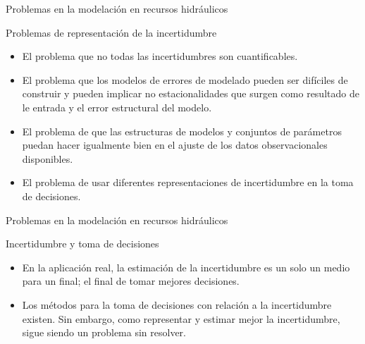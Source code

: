 \documentclass[
10pt,
aspectratio=169,
]{beamer}
\begin{document}
\begin{frame}{Problemas en la modelaci\'on en recursos hidr\'aulicos}
\begin{block}{Problemas de representación de la incertidumbre}
\begin{itemize}
\item El problema que no todas las incertidumbres son cuantificables.
\item El problema que los modelos de  errores de modelado pueden ser difíciles de construir y pueden implicar no estacionalidades que surgen como resultado de le entrada y el error estructural del modelo.
\item El problema de que las estructuras de modelos y conjuntos de parámetros puedan hacer igualmente bien en el ajuste de los datos observacionales disponibles.
\item El problema de usar diferentes representaciones de incertidumbre en la toma de decisiones.  
\end{itemize}
\end{block}
\end{frame}

\begin{frame}{Problemas en la modelaci\'on en recursos hidr\'aulicos}
\begin{block}{Incertidumbre y toma de decisiones}
\begin{itemize}
\item En la aplicación real, la estimación de la incertidumbre es un solo un medio para un final; el final de tomar mejores decisiones.
\item Los métodos para la toma de decisiones con relación a la incertidumbre existen. Sin embargo, como representar y estimar mejor la incertidumbre, sigue siendo un problema sin resolver. 
\end{itemize}
\end{block}
\end{frame}


\end{document}

